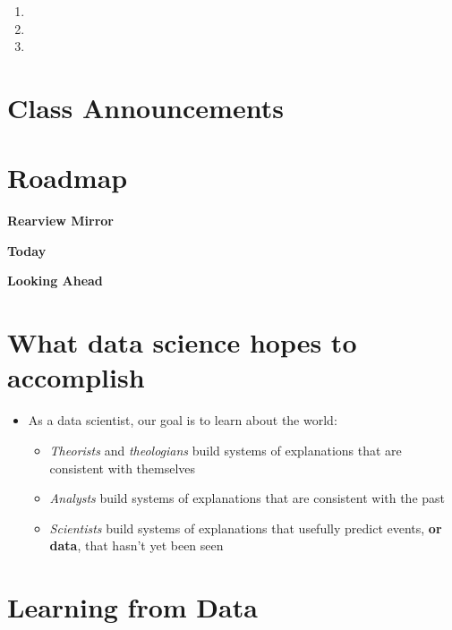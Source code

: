 \documentclass[
]{book}
\providecommand{\tightlist}{%
  \setlength{\itemsep}{0pt}\setlength{\parskip}{0pt}}
\theoremstyle{definition}
\theoremstyle{definition}
\theoremstyle{definition}
\theoremstyle{definition}
\theoremstyle{remark}
\begin{document}
\begin{enumerate}
\def\labelenumi{\arabic{enumi}.}
\tightlist
\item
\item
\item
\end{enumerate}

\hypertarget{class-announcements-11}{%
\section{Class Announcements}\label{class-announcements-11}}

\hypertarget{roadmap-9}{%
\section{Roadmap}\label{roadmap-9}}

\textbf{Rearview Mirror}

\textbf{Today}

\textbf{Looking Ahead}

\hypertarget{what-data-science-hopes-to-accomplish}{%
\section{What data science hopes to accomplish}\label{what-data-science-hopes-to-accomplish}}

\begin{itemize}
\tightlist
\item
  As a data scientist, our goal is to learn about the world:

  \begin{itemize}
  \tightlist
  \item
    \emph{Theorists} and \emph{theologians} build systems of explanations that are consistent with themselves
  \item
    \emph{Analysts} build systems of explanations that are consistent with the past
  \item
    \emph{Scientists} build systems of explanations that usefully predict events, \textbf{or data}, that hasn't yet been seen
  \end{itemize}
\end{itemize}

\hypertarget{learning-from-data}{%
\section{Learning from Data}\label{learning-from-data}}
\end{document}
